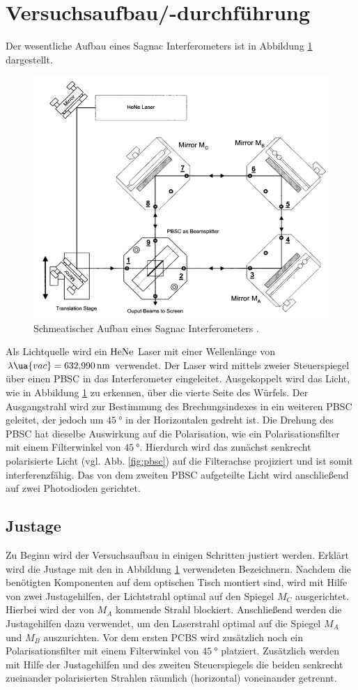 \section{Versuchsaufbau/-durchführung}\label{sec: procedure}
Der wesentliche Aufbau eines Sagnac Interferometers ist in Abbildung \ref{fig:sagnac_interferometer}
dargestellt.
\begin{figure}
\centering
\includegraphics[width=0.6\linewidth]{./content/images/aufbau.png}
\caption{Schmeatischer Aufbau eines Sagnac Interferometers \cite{anleitung64}.}
\label{fig:sagnac_interferometer}
\end{figure}
Als Lichtquelle wird ein $\ce{HeNe}$ Laser mit einer Wellenlänge von
$\lambda\ua{vac}=\SI{632.990}{\nano\meter}$ verwendet. Der Laser wird mittels zweier Steuerspiegel
über einen PBSC in das Interferometer eingeleitet. Ausgekoppelt wird das Licht, wie
in Abbildung \ref{fig:sagnac_interferometer} zu erkennen, über die vierte Seite
des Würfels.
Der Ausgangstrahl wird zur Bestimmung des Brechungsindexes in ein weiteren
PBSC geleitet, der jedoch um $\SI{45}{\degree}$ in der Horizontalen gedreht ist.
Die Drehung des PBSC hat dieselbe Auswirkung auf die Polarisation, wie ein Polarisationsfilter mit
einem Filterwinkel von $\SI{45}{\degree}$. Hierdurch wird das zunächst senkrecht
polarisierte Licht (vgl. Abb. \ref{fig:pbsc}) auf die Filterachse projiziert und
ist somit interferenzfähig. Das von dem zweiten PBSC aufgeteilte Licht wird
anschließend auf zwei Photodioden gerichtet.

\subsection{Justage}
Zu Beginn wird der Versuchsaufbau in einigen Schritten justiert werden.
Erklärt wird die Justage mit den in Abbildung \ref{fig:sagnac_interferometer} verwendeten Bezeichnern.
Nachdem die benötigten Komponenten auf dem optischen Tisch montiert sind,
wird mit Hilfe von zwei Justagehilfen, der Lichtstrahl optimal auf den Spiegel $M_C$
ausgerichtet. Hierbei wird der von $M_A$ kommende Strahl blockiert.
Anschließend werden die Justagehilfen dazu verwendet, um den Laserstrahl optimal auf
die Spiegel $M_A$ und $M_B$ auszurichten. Vor dem ersten PCBS wird zusätzlich noch ein Polarisationsfilter
mit einem Filterwinkel von $\SI{45}{\degree}$ platziert. Zusätzlich werden mit Hilfe der Justagehilfen
und des zweiten Steuerspiegels die beiden senkrecht zueinander polarisierten Strahlen räumlich (horizontal)
voneinander getrennt.

